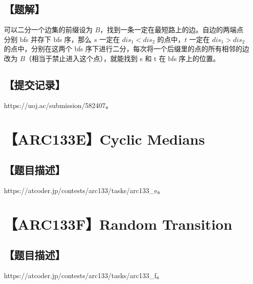 \documentclass[UTF8,12pt,a4paper]{ctexart}
\begin{document}
	\subsection*{【题解】}
	
	可以二分一个边集的前缀设为 $B$，找到一条一定在最短路上的边。自边的两端点分别 bfs 并存下 bfs 序，那么 $s$ 一定在 $dis_1<dis_2$ 的点中，$t$ 一定在 $dis_1>dis_2$ 的点中，分别在这两个 bfs 序下进行二分，每次将一个后缀里的点的所有相邻的边改为 $B$（相当于禁止进入这个点），就能找到 s 和 t 在 bfs 序上的位置。
		
	\subsection*{【提交记录】}
	
	https://uoj.ac/submission/582407。
	
	
	\section*{【ARC133E】Cyclic Medians}
	
	\subsection*{【题目描述】}
	
	https://atcoder.jp/contests/arc133/tasks/arc133\_e。
	
	
	\section*{【ARC133F】Random Transition}
	
	\subsection*{【题目描述】}
	
	https://atcoder.jp/contests/arc133/tasks/arc133\_f。
	
\end{document}
